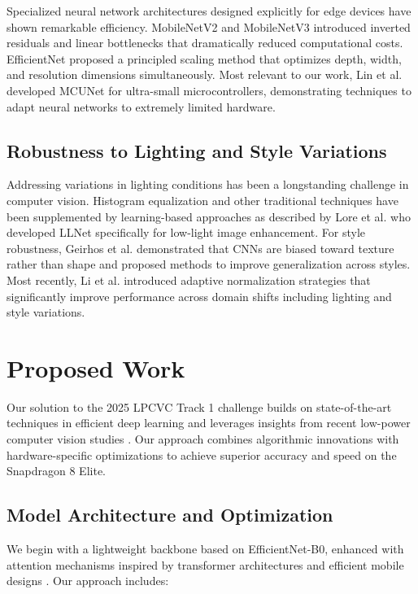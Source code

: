 \documentclass[11pt, oneside]{article}   	%
\begin{document}
Specialized neural network architectures designed explicitly for edge devices have shown remarkable efficiency. MobileNetV2 \cite{sandler2018mobilenetv2} and MobileNetV3 \cite{howard2019searching} introduced inverted residuals and linear bottlenecks that dramatically reduced computational costs. EfficientNet \cite{tan2019efficientnet} proposed a principled scaling method that optimizes depth, width, and resolution dimensions simultaneously. Most relevant to our work, Lin et al. \cite{lin2021mcunet} developed MCUNet for ultra-small microcontrollers, demonstrating techniques to adapt neural networks to extremely limited hardware.

\subsection*{Robustness to Lighting and Style Variations}

Addressing variations in lighting conditions has been a longstanding challenge in computer vision. Histogram equalization and other traditional techniques have been supplemented by learning-based approaches as described by Lore et al. \cite{lore2017llnet} who developed LLNet specifically for low-light image enhancement. For style robustness, Geirhos et al. \cite{geirhos2019imagenet} demonstrated that CNNs are biased toward texture rather than shape and proposed methods to improve generalization across styles. Most recently, Li et al. \cite{li2022domain} introduced adaptive normalization strategies that significantly improve performance across domain shifts including lighting and style variations.

\section*{Proposed Work}

Our solution to the 2025 LPCVC Track 1 challenge builds on state-of-the-art techniques in efficient deep learning and leverages insights from recent low-power computer vision studies \cite{chen20242023lowpowercomputervision}. Our approach combines algorithmic innovations with hardware-specific optimizations to achieve superior accuracy and speed on the Snapdragon 8 Elite.

\subsection*{Model Architecture and Optimization}

We begin with a lightweight backbone based on EfficientNet-B0, enhanced with attention mechanisms inspired by transformer architectures \cite{dosovitskiy2021imageworth16x16words,touvron2021trainingdataefficientimagetransformers} and efficient mobile designs \cite{pan2022edgevitscompetinglightweightcnns}. Our approach includes:
\end{document}
